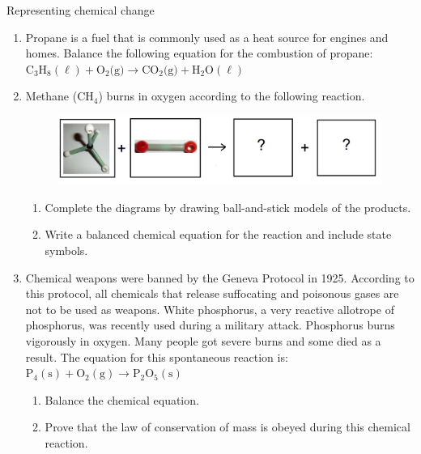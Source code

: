             \begin{eocexercises}{Representing chemical change}
            \nopagebreak \noindent
      \label{m38727*id67334}\begin{enumerate}[noitemsep, label=\textbf{\arabic*}. ] 
\label{m38727*uid45}\item Propane is a fuel that is commonly used as a heat source for engines and homes. Balance the following equation for the combustion of propane:
${\text{C}}_{3}{\text{H}}_{8} (\ell) + \text{O}_{2} \text{(g)} \to \text{CO}_{2} \text{(g)} + \text{H}_{2}\text{O} (\ell)$
        \label{m38727*uid47}\item Methane ($\text{CH}_{4}$) burns in oxygen according to the following reaction. \\
\begin{figure}[H]
\begin{center}
 \includegraphics[width=.8\textwidth]{photos/methane_O2_rxn.png}
\end{center}
\end{figure}
\begin{enumerate}[noitemsep, label=\textbf{\alph*}.]
 \item Complete the diagrams by drawing ball-and-stick models of the products.
\item Write a balanced chemical equation for the reaction and include state symbols.
\end{enumerate}
 \label{m38727*uid48}\item Chemical weapons were banned by the Geneva Protocol in 1925. According to this protocol, all chemicals that release suffocating and poisonous gases are not to be used as weapons. White phosphorus, a very reactive allotrope of phosphorus, was recently used during a military attack. Phosphorus burns vigorously in oxygen. Many people got severe burns and some died as a result. The equation for this spontaneous reaction is:
        ${\text{P}}_{4}\left(\text{s}\right)+{\text{O}}_{2}\left(\text{g}\right)\to {\text{P}}_{2}{\text{O}}_{5}\left(\text{s}\right)$\label{m38727*id67821}\begin{enumerate}[noitemsep, label=\textbf{\alph*}. ] 
            \label{m38727*uid49}\item Balance the chemical equation.
\label{m38727*uid50}\item Prove that the law of conservation of mass is obeyed during this chemical reaction.

\end{enumerate}
\end{enumerate}
\end{eocexercises}
